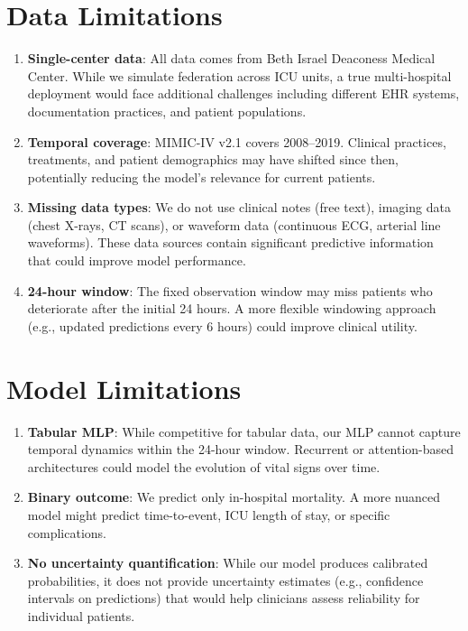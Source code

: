 \documentclass[11pt,a4paper]{report}
\begin{document}
\section{Data Limitations}

\begin{enumerate}[leftmargin=2em]
\item \textbf{Single-center data}: All data comes from Beth Israel Deaconess Medical Center. While we simulate federation across ICU units, a true multi-hospital deployment would face additional challenges including different EHR systems, documentation practices, and patient populations.
\item \textbf{Temporal coverage}: MIMIC-IV v2.1 covers 2008--2019. Clinical practices, treatments, and patient demographics may have shifted since then, potentially reducing the model's relevance for current patients.
\item \textbf{Missing data types}: We do not use clinical notes (free text), imaging data (chest X-rays, CT scans), or waveform data (continuous ECG, arterial line waveforms). These data sources contain significant predictive information that could improve model performance.
\item \textbf{24-hour window}: The fixed observation window may miss patients who deteriorate after the initial 24 hours. A more flexible windowing approach (e.g., updated predictions every 6 hours) could improve clinical utility.
\end{enumerate}

\section{Model Limitations}

\begin{enumerate}[leftmargin=2em]
\item \textbf{Tabular MLP}: While competitive for tabular data, our MLP cannot capture temporal dynamics within the 24-hour window. Recurrent or attention-based architectures could model the evolution of vital signs over time.
\item \textbf{Binary outcome}: We predict only in-hospital mortality. A more nuanced model might predict time-to-event, ICU length of stay, or specific complications.
\item \textbf{No uncertainty quantification}: While our model produces calibrated probabilities, it does not provide uncertainty estimates (e.g., confidence intervals on predictions) that would help clinicians assess reliability for individual patients.
\end{enumerate}
\end{document}
